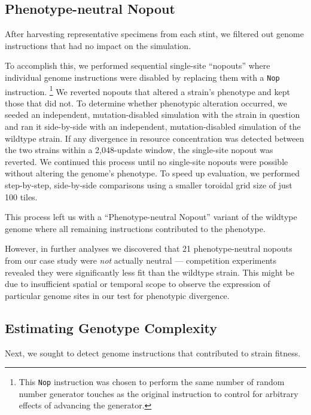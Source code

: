 \subsection{Phenotype-neutral Nopout}
\label{sec:phenotype_neutral_nopout}

After harvesting representative specimens from each stint, we filtered out genome instructions that had no impact on the simulation.

To accomplish this, we performed sequential single-site ``nopouts'' where individual genome instructions were disabled by replacing them with a \texttt{Nop} instruction.%
\footnote{
This \texttt{Nop} instruction was chosen to perform the same number of random number generator touches as the original instruction to control for arbitrary effects of advancing the generator.
}
We reverted nopouts that altered a strain's phenotype and kept those that did not.
To determine whether phenotypic alteration occurred, we seeded an independent, mutation-disabled simulation with the strain in question and ran it side-by-side with an independent, mutation-disabled simulation of the wildtype strain.
If any divergence in resource concentration was detected between the two strains within a 2,048-update window, the single-site nopout was reverted.
We continued this process until no single-site nopouts were possible without altering the genome's phenotype.
To speed up evaluation, we performed step-by-step, side-by-side comparisons using a smaller toroidal grid size of just 100 tiles.

This process left us with a ``Phenotype-neutral Nopout'' variant of the wildtype genome where all remaining instructions contributed to the phenotype.

However, in further analyses we discovered that 21 phenotype-neutral nopouts from our case study were \textit{not} actually neutral --- competition experiments revealed they were significantly less fit than the wildtype strain.
This might be due to insufficient spatial or temporal scope to observe the expression of particular genome sites in our test for phenotypic divergence.

\subsection{Estimating Genotype Complexity}

Next, we sought to detect genome instructions that contributed to strain fitness.

